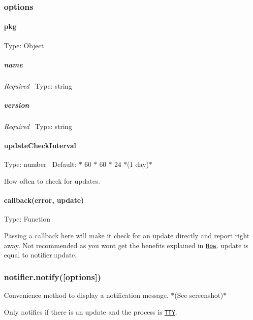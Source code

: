 \subsubsection*{options}

\paragraph*{pkg}

Type\+: {\ttfamily Object}

\subparagraph*{name}

{\itshape Required}~\newline
 Type\+: {\ttfamily string}

\subparagraph*{version}

{\itshape Required}~\newline
 Type\+: {\ttfamily string}

\paragraph*{update\+Check\+Interval}

Type\+: {\ttfamily number}~\newline
 Default\+: { $\ast$ 60 $\ast$ 60 $\ast$ 24} $\ast$(1 day)$\ast$

How often to check for updates.

\paragraph*{callback(error, update)}

Type\+: {\ttfamily Function}

Passing a callback here will make it check for an update directly and report right away. Not recommended as you won\textquotesingle{}t get the benefits explained in \href{#how}{\tt {\ttfamily How}}. {\ttfamily update} is equal to {\ttfamily notifier.\+update}.

\subsubsection*{notifier.\+notify(\mbox{[}options\mbox{]})}

Convenience method to display a notification message. $\ast$(See screenshot)$\ast$

Only notifies if there is an update and the process is \href{https://nodejs.org/api/process.html#process_tty_terminals_and_process_stdout}{\tt T\+TY}.

